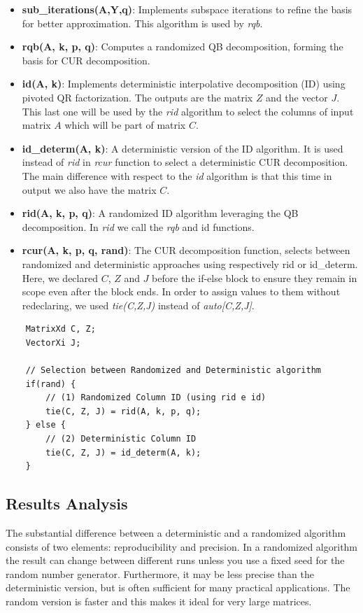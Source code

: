 \documentclass[11pt,a4paper]{article}
\begin{document}
\begin{itemize}
    \item \textbf{sub\_iterations(A,Y,q)}: Implements subspace iterations to refine the basis for better approximation. This algorithm is used by \textit{rqb}.
    \item \textbf{rqb(A, k, p, q)}: Computes a randomized QB decomposition, forming the basis for CUR decomposition.
    \item \textbf{id(A, k)}: Implements deterministic interpolative decomposition (ID) using pivoted QR factorization. The outputs are the matrix $Z$ and the vector $J$. This last one will be used by the \textit{rid} algorithm to select the columns of input matrix $A$ which will be part of matrix $C$.
    \item \textbf{id\_determ(A, k)}: A deterministic version of the ID algorithm. It is used instead of \textit{rid} in \textit{rcur} function to select a deterministic CUR decomposition. The main difference with respect to the \textit{id} algorithm is that this time in output we also have the matrix $C$.
    \item \textbf{rid(A, k, p, q)}: A randomized ID algorithm leveraging the QB decomposition. In\textit{ rid} we call the \textit{rqb} and id functions. 
    \item \textbf{rcur(A, k, p, q, rand)}: The CUR decomposition function, selects between randomized and deterministic approaches using respectively rid or id\_determ. Here, we declared $C$, $Z$ and $J$ before the if-else block to ensure they remain in scope even after the block ends. In order to assign values to them without redeclaring, we used \textit{tie(C,Z,J)} instead of \textit{auto[C,Z,J]}.
\end{itemize}

\begin{verbatim}
    MatrixXd C, Z;
    VectorXi J;

    // Selection between Randomized and Deterministic algorithm
    if(rand) {
        // (1) Randomized Column ID (using rid e id)
        tie(C, Z, J) = rid(A, k, p, q);
    } else {
        // (2) Deterministic Column ID
        tie(C, Z, J) = id_determ(A, k);
    }
\end{verbatim}



\subsection{Results Analysis}
The substantial difference between a deterministic and a randomized algorithm consists of two elements: reproducibility and precision.
In a randomized algorithm the result can change between different runs unless you use a fixed seed for the random number generator. Furthermore, it may be less precise than the deterministic version, but is often sufficient for many practical applications. The random version is faster and this makes it ideal for very large matrices.
\end{document}
